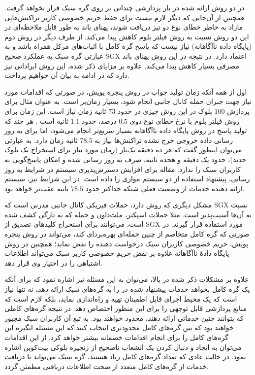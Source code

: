 در دو روش ارائه شده در \cite{Matetic2019} بار پردازشی چندانی بر روی گره سبک قرار نخواهد گرفت. همچنین از آن‌جایی که دیگر لازم نیست برای حفظ حریم خصوصی کاربر تراکنش‌هایی مازاد به خاطر خطای نوع دو نیز دریافت شوند، پهنای باند به طور قابل ملاحظه‌ای در این دو روش نسبت به روش فیلتر بلوم کاهش پیدا می‌کند. از طرف دیگر در روش دوم (پایگاه داده ناآگاهانه) نیاز نیست که پاسخ گره کامل با اثبات‌های مرکل همراه باشد و به عبارتی گره سبک به عملکرد صحیح SGX اعتماد دارد. در نتیجه در این روش پهنای باند مصرفی بسیار کاهش پیدا می‌کند. علاوه بر مزایای ذکر شده، این روش ایراداتی نیز دارد که در ادامه به بیان آن خواهیم پرداخت.

اول از همه آنکه زمان تولید جواب در روش پنجره پویش، در صورتی که اقدامات مورد نیاز جهت جبران حمله کانال جانبی انجام شود، بسیار زمان‌بر است. به عنوان مثال برای پردازش  $100$ بلوک در این روش چیزی در حدود $73$ ثانیه زمان نیاز است. این زمان برای روش فیلتر بلوم با نرخ خطای نوع دوی $0.5$ درصد، حدود $1.1$ ثانیه است \cite{Matetic2019}. هر چند که تولید پاسخ در روش  پایگاه داده ناآگاهانه بسیار سریع‌تر انجام می‌شود، اما برای به روز رسانی داده خروجی‌ خرج نشده تراکنش‌ها نیاز به $78.5$ ثانیه زمان دارد. به عبارتی می‌توان اینطور گفت که هر ده دقیقه یک‌بار (زمان مورد نیاز برای استخراج یک بلوک جدید)، حدود یک دقیقه و هجده ثانیه،‌ صرف به روز رسانی شده و امکان پاسخ‌گویی به کاربران سبک را ندارد. مقاله \cite{Matetic2019} برای افزایش دسترس‌پذیری سیستم در شرایط به روز رسانی، پیشنهاد استفاده از دو سیستم موازی را داده است. در این شرایط نیز،‌ سیستم ارائه دهنده خدمات از وضعیت فعلی شبکه حداکثر حدود $78.5$ ثانیه عقب‌تر خواهد بود.

مشکل دیگری که روش \cite{Matetic2019} دارد، حملات فیزیکی کانال جانبی مدرنی است که SGX نسبت به آن‌ها آسیب‌پذیر است. مثلا حملات اسپکتر\cite{Kocher2019}، ملت‌داون\cite{Lipp2020} و حمله \cite{Bulck2020} که به تازگی کشف شده است، می‌توانند برای استخراج کلید‌های تصدیق از ‌SGX مورد استفاده قرار گیرند. در صورتی که گره کامل متخاصم از چنین حمله‌ای بهره‌بردای کند، می‌تواند در روش پنجره پویش، حریم خصوصی کاربران سبک درخواست دهنده را نقض نماید؛ همچنین در روش پایگاه دادهٔ ناآگاهانه علاوه بر نقض حریم خصوصی کاربر سبک می‌تواند اطلاعات اشتباهی را در اختیار وی قرار دهد.

علاوه بر مشکلات ذکر شده در بالا، می‌توان به این مسئله نیز اشاره نمود که برای آنکه یک گره کامل بخواهد خدمات پیشنهاد شده در \cite{Matetic2019} را به گره‌های سبک ارائه دهد، نه تنها نیاز است که یک محیط اجرای قابل اطمینان تهیه و راه‌اندازی نماید، بلکه لازم است که منابع پردازشی قابل توجهی را برای این منظور اختصاص دهد. در نتیجه گره‌های کاملی که بتوانند چنین خدماتی ارائه دهند، محدود خواهند بود. به تبع آن کاربران سبک مجبور خواهند بود که بین گره‌های کامل محدود‌تری انتخاب کنند که این مسئله انگیزه این گره‌های کامل را برای انجام اقدامات خصمانه بیشتر خواهد کرد. از این اقدامات می‌توان به ایجاد و دنبال کردن یک انشعاب ناصحیح از زنجیره بلوکی بیت‌کوین اشاره نمود. در حالت عادی که تعداد گره‌های کامل زیاد هستند، گره سبک می‌تواند با دریافت خدمات از گره‌های کامل متعدد از صحت اطلاعات دریافتی مطمئن گردد.

